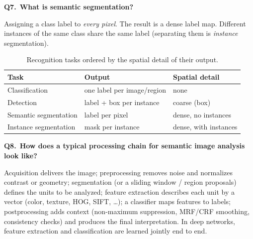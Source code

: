 \documentclass[11pt,a4paper]{article}
\newcommand{\keep}[1]{\par
  \ifdim\dimexpr\pagegoal-\pagetotal\relax<#1\relax\newpage\fi}
\newcommand{\q}[2]{\keep{2.5cm}\medskip
  {\sffamily\bfseries\color{questc}Q#1.}\ {\sffamily\bfseries #2}\par}
\begin{document}
\q{7}{What is semantic segmentation?}
Assigning a class label to \emph{every pixel}. The result is a dense label map.
Different instances of the same class share the same label (separating them is
\emph{instance} segmentation).

\begin{table}[ht]
  \centering\small
  \begin{tabular}{@{}lll@{}}
    \toprule
    Task & Output & Spatial detail \\
    \midrule
    Classification & one label per image/region & none \\
    Detection & label + box per instance & coarse (box) \\
    Semantic segmentation & label per pixel & dense, no instances \\
    Instance segmentation & mask per instance & dense, with instances \\
    \bottomrule
  \end{tabular}
  \caption{Recognition tasks ordered by the spatial detail of their output.}
\end{table}

\q{8}{How does a typical processing chain for semantic image analysis look like?}
\begin{center}
\end{center}
\noindent
Acquisition delivers the image; preprocessing removes noise and normalizes
contrast or geometry; segmentation (or a sliding window / region proposals)
defines the units to be analyzed; feature extraction describes each unit by a
vector (color, texture, HOG, SIFT, \dots); a classifier maps features to labels;
postprocessing adds context (non-maximum suppression, MRF/CRF smoothing,
consistency checks) and produces the final interpretation. In deep networks,
feature extraction and classification are learned jointly end to end.
\end{document}
